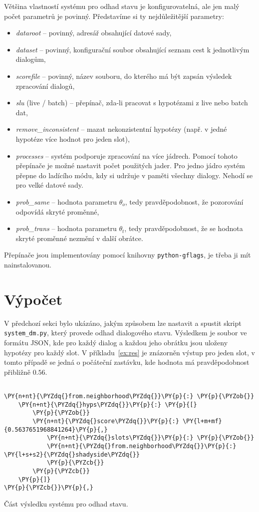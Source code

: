 Většina vlastností systému pro odhad stavu je konfigurovatelná, ale jen malý počet parametrů je povinný.
Představíme si ty nejdůležitější parametry:
\begin{itemize}
\item \emph{dataroot} -- povinný, adresář obsahující datové sady,
\item \emph{dataset} -- povinný, konfigurační soubor obsahující seznam cest k jednotlivým dialogům,
\item \emph{scorefile} -- povinný, název souboru, do kterého má být zapsán výsledek zpracování dialogů,
\item \emph{slu} (live / batch) -- přepínač, zda-li pracovat s hypotézami z live nebo batch dat,
\item \emph{remove\_inconsistent} -- mazat nekonzistentní hypotézy (např. v jedné hypotéze více hodnot pro jeden slot),
\item \emph{processes} -- systém podporuje zpracování na více jádrech. Pomocí tohoto přepínače je možné nastavit počet použitých jader. Pro jedno jádro systém přepne do ladícího módu, kdy si udržuje v paměti všechny dialogy. Nehodí se pro velké datové sady.
\item \emph{prob\_same} -- hodnota parametru $\theta_o$, tedy pravděpodobnost, že pozorování odpovídá skryté proměnné,
\item \emph{prob\_trans} -- hodnota parametru $\theta_t$, tedy pravděpodobnost, že se hodnota skryté proměnné nezmění v další obrátce.
\end{itemize}

Přepínače jsou implementovány pomocí knihovny \texttt{python-gflags}, je třeba ji mít nainstalovanou.

\section{Výpočet}

V předchozí sekci bylo ukázáno, jakým způsobem lze nastavit a spustit skript \texttt{system\_dm.py}, který provede odhad dialogového stavu.
Výsledkem je soubor ve formátu JSON, kde pro každý dialog a každou jeho obrátku jsou uloženy hypotézy pro každý slot.
V příkladu~\ref{ex:res} je znázorněn výstup pro jeden slot, v tomto případě se jedná o počáteční zastávku, kde hodnota  má pravděpodobnost přibližně $0.56$.

\begin{example}
\begin{Verbatim}[commandchars=\\\{\}]

\PY{n+nt}{\PYZdq{}from.neighborhood\PYZdq{}}\PY{p}{:} \PY{p}{\PYZob{}}
    \PY{n+nt}{\PYZdq{}hyps\PYZdq{}}\PY{p}{:} \PY{p}{[}
        \PY{p}{\PYZob{}}
	    \PY{n+nt}{\PYZdq{}score\PYZdq{}}\PY{p}{:} \PY{l+m+mf}{0.5637651968841264}\PY{p}{,}
            \PY{n+nt}{\PYZdq{}slots\PYZdq{}}\PY{p}{:} \PY{p}{\PYZob{}}
	        \PY{n+nt}{\PYZdq{}from.neighborhood\PYZdq{}}\PY{p}{:} \PY{l+s+s2}{\PYZdq{}shadyside\PYZdq{}}
            \PY{p}{\PYZcb{}}
        \PY{p}{\PYZcb{}}
    \PY{p}{]}
\PY{p}{\PYZcb{}}\PY{p}{,}
\end{Verbatim}
\caption{Část výsledku systému pro odhad stavu.}
\label{ex:res}
\end{example}

